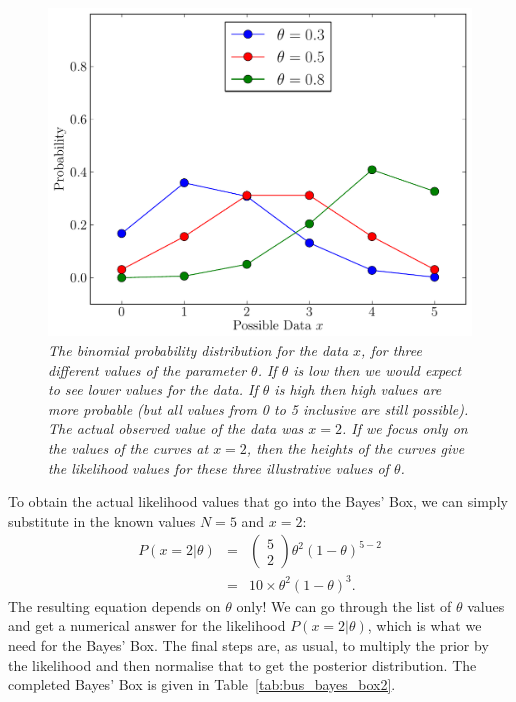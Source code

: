 \begin{figure}[h!]
\begin{center}
\includegraphics[scale=0.6]{Figures/binomial.pdf}
\caption{\it The binomial probability distribution for the data $x$, for three different values of the parameter $\theta$. If $\theta$ is
low then we would expect to see lower values for the data. If $\theta$ is high
then high values are more probable (but all values from 0 to 5 inclusive are
still possible). The actual observed value of the data was $x=2$. If we focus
only on the values of the curves at $x=2$, then the heights of the curves give
the likelihood values for these three illustrative values of $\theta$.
\label{fig:binomial}}
\end{center}
\end{figure}
To obtain the actual likelihood values that go into the Bayes' Box, we can
simply substitute in the known values $N=5$ and $x=2$:
\begin{eqnarray}
P(x=2|\theta) &=& \left(\begin{array}{c}5 \\ 2\end{array}\right)
\theta^2\left(1-\theta\right)^{5 - 2}\\
&=& 10\times\theta^2\left(1-\theta\right)^3.\label{eq:binomial_likelihood3}
\end{eqnarray}
The resulting equation depends on $\theta$ only! We can go through the list of
$\theta$ values and get a numerical answer for the likelihood $P(x=2|\theta)$,
which is what we need for the Bayes' Box. The final steps are, as usual, to
multiply the prior by the likelihood and then normalise that to get the
posterior distribution. The completed Bayes' Box is given in
Table~\ref{tab:bus_bayes_box2}.

